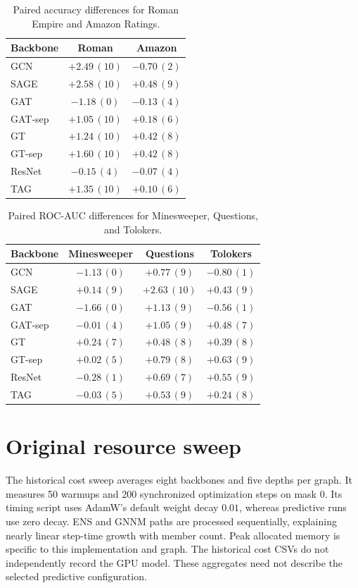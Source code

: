 \begin{table}[h]
\centering
\caption{Paired accuracy differences for Roman Empire and Amazon Ratings.}
\label{tab:paired}
\setlength{\tabcolsep}{5pt}
\begin{tabular}{lcc}
\toprule
Backbone & Roman & Amazon \\
\midrule
GCN & $+2.49\,(10)$ & $-0.70\,(2)$ \\
SAGE & $+2.58\,(10)$ & $+0.48\,(9)$ \\
GAT & $-1.18\,(0)$ & $-0.13\,(4)$ \\
GAT-sep & $+1.05\,(10)$ & $+0.18\,(6)$ \\
GT & $+1.24\,(10)$ & $+0.42\,(8)$ \\
GT-sep & $+1.60\,(10)$ & $+0.42\,(8)$ \\
ResNet & $-0.15\,(4)$ & $-0.07\,(4)$ \\
TAG & $+1.35\,(10)$ & $+0.10\,(6)$ \\
\bottomrule
\end{tabular}
\end{table}

\begin{table}[h]
\centering
\caption{Paired ROC-AUC differences for Minesweeper, Questions, and Tolokers.}
\label{tab:paired-auc}
\setlength{\tabcolsep}{5pt}
\begin{tabular}{lccc}
\toprule
Backbone & Minesweeper & Questions & Tolokers \\
\midrule
GCN & $-1.13\,(0)$ & $+0.77\,(9)$ & $-0.80\,(1)$ \\
SAGE & $+0.14\,(9)$ & $+2.63\,(10)$ & $+0.43\,(9)$ \\
GAT & $-1.66\,(0)$ & $+1.13\,(9)$ & $-0.56\,(1)$ \\
GAT-sep & $-0.01\,(4)$ & $+1.05\,(9)$ & $+0.48\,(7)$ \\
GT & $+0.24\,(7)$ & $+0.48\,(8)$ & $+0.39\,(8)$ \\
GT-sep & $+0.02\,(5)$ & $+0.79\,(8)$ & $+0.63\,(9)$ \\
ResNet & $-0.28\,(1)$ & $+0.69\,(7)$ & $+0.55\,(9)$ \\
TAG & $-0.03\,(5)$ & $+0.53\,(9)$ & $+0.24\,(8)$ \\
\bottomrule
\end{tabular}
\end{table}

\section{Original resource sweep}\label{app:cost-details}
The historical cost sweep averages eight backbones and five depths
per graph. It measures 50 warmups and 200 synchronized optimization
steps on mask 0. Its timing script uses AdamW's default weight decay
$0.01$, whereas predictive runs use zero decay. ENS and GNNM paths
are processed sequentially, explaining nearly linear step-time growth
with member count. Peak allocated memory is specific to this
implementation and graph. The historical cost CSVs do not
independently record the GPU model. These aggregates need not describe
the selected predictive configuration.

